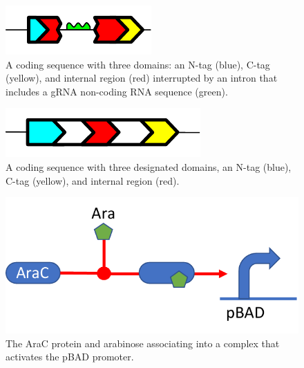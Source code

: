 {\begin{figure}[h!]
\includegraphics[scale=1.0]{figures/apdx-examples/apdx-exa20-intron.pdf}
\caption{A coding sequence with three domains: an N-tag (blue), C-tag (yellow), and internal region (red) interrupted by an intron that includes a gRNA non-coding RNA sequence (green).}
\label{f:apdx:exa20}
\end{figure}

\begin{figure}[h!]
\includegraphics[scale=1.0]{figures/apdx-examples/apdx-exa21-polypeptide-region.pdf}
\caption{A coding sequence with three designated domains, an N-tag (blue), C-tag (yellow), and internal region (red).}
\label{f:apdx:exa21}
\end{figure}

\begin{figure}[h!]
\includegraphics[scale=0.75]{figures/apdx-examples/apdx-exa22.pdf}
\caption{The AraC protein and arabinose associating into a complex that activates the pBAD promoter.}
\label{f:apdx:exa22}
\end{figure}

}



